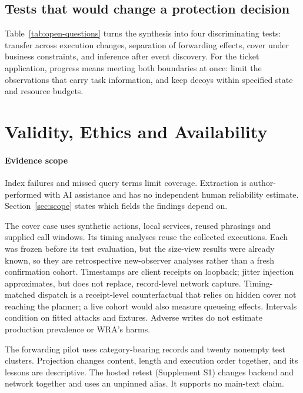 \subsection{Tests that would change a protection decision}
Table~\ref{tab:open-questions} turns the synthesis into four discriminating tests: transfer across execution changes, separation of forwarding effects, cover under business constraints, and inference after event discovery. For the ticket application, progress means meeting both boundaries at once: limit the observations that carry task information, and keep decoys within specified state and resource budgets.

\section{Validity, Ethics and Availability}\label{sec:validity}
\paragraph{Evidence scope}
Index failures and missed query terms limit coverage. Extraction is author-performed with AI assistance and has no independent human reliability estimate. Section~\ref{sec:scope} states which fields the findings depend on.

The cover case uses synthetic actions, local services, reused phrasings and supplied call windows. Its timing analyses reuse the collected executions. Each was frozen before its test evaluation, but the size-view results were already known, so they are retrospective new-observer analyses rather than a fresh confirmation cohort. Timestamps are client receipts on loopback; jitter injection approximates, but does not replace, record-level network capture. Timing-matched dispatch is a receipt-level counterfactual that relies on hidden cover not reaching the planner; a live cohort would also measure queueing effects. Intervals condition on fitted attacks and fixtures. Adverse writes do not estimate production prevalence or WRA's harms.

The forwarding pilot uses category-bearing records and twenty nonempty test clusters. Projection changes content, length and execution order together, and its lessons are descriptive. The hosted retest (Supplement S1) changes backend and network together and uses an unpinned alias. It supports no main-text claim.


